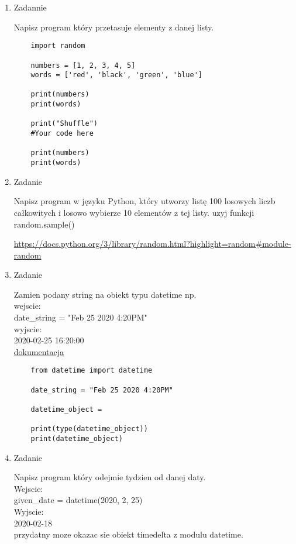 \documentclass[11pt]{article}
\begin{document}
\begin{enumerate}
\item 
\begin{Large}
	Zadannie
\end{Large}
\par
Napisz program który przetasuje elementy z danej listy.
\begin{lstlisting}
	import random
	
	numbers = [1, 2, 3, 4, 5]
	words = ['red', 'black', 'green', 'blue']
	
	print(numbers)
	print(words)
	
	print("Shuffle")
	#Your code here
	
	print(numbers)
	print(words)
\end{lstlisting}

\item 
\begin{Large}
	Zadanie
\end{Large}
\par
Napisz program w języku Python, który utworzy listę 100 losowych liczb całkowitych i losowo wybierze 10 elementów z tej listy.
uzyj funkcji random.sample()
\par
\href{https://docs.python.org/3/library/random.html?highlight=random#module-random}{https://docs.python.org/3/library/random.html?highlight=random#module-random}

\item 
\begin{Large}
	Zadanie
\end{Large}
\par
Zamien podany string na obiekt typu datetime np.\\
wejscie:\\
date\_string = "Feb 25 2020 4:20PM"\\
wyjscie:\\
2020-02-25 16:20:00\\

\href{https://docs.python.org/3/library/datetime.html?highlight=strptime#datetime.datetime.strptime}{dokumentacja}

\begin{lstlisting}
	from datetime import datetime
	
	date_string = "Feb 25 2020 4:20PM"
	
	datetime_object = 
	
	print(type(datetime_object))
	print(datetime_object)
\end{lstlisting}

\item 
\begin{Large}
	Zadanie
\end{Large}
\par
Napisz program który odejmie tydzien od danej daty.\\
Wejscie:\\
given\_date = datetime(2020, 2, 25)\\
Wyjscie:\\
2020-02-18\\
przydatny moze okazac sie obiekt timedelta z modulu datetime.


\end{enumerate}
\end{document}
